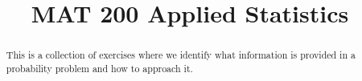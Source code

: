 \documentclass{xourse}
\title{MAT 200 Applied Statistics}%
\begin{document}
      
\begin{abstract} %
This is a collection of exercises where we identify what information is provided in a probability problem and how to approach it.
\end{abstract}
      
\maketitle
      


      
\end{document}
